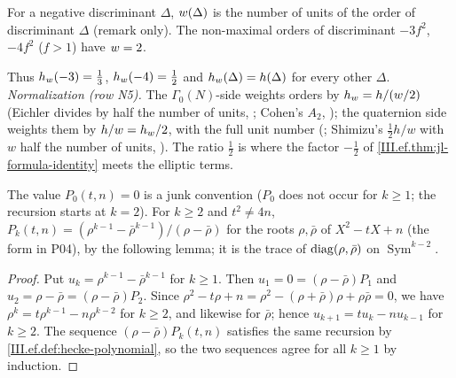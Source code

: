 \begin{definition}
\end{definition}
\noindent For a negative discriminant $\Delta$, $w(\Delta)$ is the number of units of the order of discriminant $\Delta$ (remark only). The
non-maximal orders of discriminant $-3f^2$, $-4f^2$ ($f>1$) have $w=2$.

\begin{definition}
\end{definition}
\noindent Thus $h_w(-3)=\frac13$, $h_w(-4)=\frac12$ and $h_w(\Delta)=h(\Delta)$ for every other $\Delta$. \emph{Normalization (row N5).} The
$\Gamma_0(N)$-side weights orders by $h_w=h/(w/2)$ (Eichler divides by half the number of units, \cite[(62), p.~296]{Eic57}; Cohen's
$A_2$, \cite[Thm.~12.4.11]{CoSt}); the quaternion side weights them by $h/w=h_w/2$, with the full unit number (\cite[Def.~2.13, p.~353]{Piz};
Shimizu's $\frac12h/w$ with $w$ half the number of units, \cite[Prop.~3.1, p.~181]{Shz}). The ratio $\frac12$ is where the factor $-\frac12$ of
\cref{III.ef.thm:jl-formula-identity} meets the elliptic terms.

\begin{definition}
\end{definition}
\noindent The value $P_0(t,n)=0$ is a junk convention ($P_0$ does not occur for $k\ge1$; the recursion starts at $k=2$). For $k\ge2$ and $t^2\ne4n$,
$P_k(t,n)=(\rho^{k-1}-\bar\rho^{k-1})/(\rho-\bar\rho)$ for the roots $\rho,\bar\rho$ of $X^2-tX+n$ (the form in P04), by the following lemma; it is the
trace of $\operatorname{diag}(\rho,\bar\rho)$ on $\operatorname{Sym}^{k-2}$.

\begin{lemma}
\end{lemma}
\begin{proof}
Put $u_k=\rho^{k-1}-\bar\rho^{k-1}$ for $k\ge1$. Then $u_1=0=(\rho-\bar\rho)P_1$ and $u_2=\rho-\bar\rho=(\rho-\bar\rho)P_2$. Since
$\rho^2-t\rho+n=\rho^2-(\rho+\bar\rho)\rho+\rho\bar\rho=0$, we have $\rho^{k}=t\rho^{k-1}-n\rho^{k-2}$ for $k\ge2$, and likewise for $\bar\rho$; hence
$u_{k+1}=tu_k-nu_{k-1}$ for $k\ge2$. The sequence $(\rho-\bar\rho)P_k(t,n)$ satisfies the same recursion by \cref{III.ef.def:hecke-polynomial}, so the
two sequences agree for all $k\ge1$ by induction.
\end{proof}

